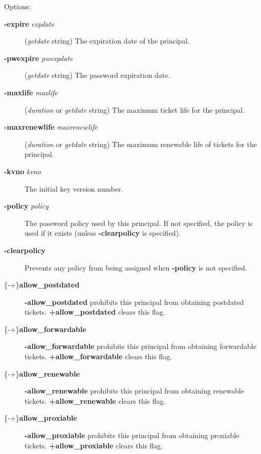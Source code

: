 \documentclass[letterpaper,10pt,english]{sphinxmanual}
\begin{document}
Options:
\begin{description}
\item[{\textbf{-expire} \emph{expdate}}] \leavevmode
(\emph{getdate} string) The expiration date of the principal.

\item[{\textbf{-pwexpire} \emph{pwexpdate}}] \leavevmode
(\emph{getdate} string) The password expiration date.

\item[{\textbf{-maxlife} \emph{maxlife}}] \leavevmode
(\emph{duration} or \emph{getdate} string) The maximum ticket life
for the principal.

\item[{\textbf{-maxrenewlife} \emph{maxrenewlife}}] \leavevmode
(\emph{duration} or \emph{getdate} string) The maximum renewable
life of tickets for the principal.

\item[{\textbf{-kvno} \emph{kvno}}] \leavevmode
The initial key version number.

\item[{\textbf{-policy} \emph{policy}}] \leavevmode
The password policy used by this principal.  If not specified, the
policy  is used if it exists (unless \textbf{-clearpolicy}
is specified).

\item[{\textbf{-clearpolicy}}] \leavevmode
Prevents any policy from being assigned when \textbf{-policy} is not
specified.

\item[{\{-\textbar{}+\}\textbf{allow\_postdated}}] \leavevmode
\textbf{-allow\_postdated} prohibits this principal from obtaining
postdated tickets.  \textbf{+allow\_postdated} clears this flag.

\item[{\{-\textbar{}+\}\textbf{allow\_forwardable}}] \leavevmode
\textbf{-allow\_forwardable} prohibits this principal from obtaining
forwardable tickets.  \textbf{+allow\_forwardable} clears this flag.

\item[{\{-\textbar{}+\}\textbf{allow\_renewable}}] \leavevmode
\textbf{-allow\_renewable} prohibits this principal from obtaining
renewable tickets.  \textbf{+allow\_renewable} clears this flag.

\item[{\{-\textbar{}+\}\textbf{allow\_proxiable}}] \leavevmode
\textbf{-allow\_proxiable} prohibits this principal from obtaining
proxiable tickets.  \textbf{+allow\_proxiable} clears this flag.


\end{description}
\end{document}
